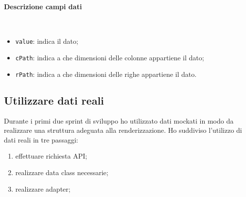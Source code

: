 \paragraph{Descrizione campi dati} \mbox{} \\
\begin{itemize}
	\item \verb|value|: indica il dato;
	\item \verb|cPath|: indica a che dimensioni delle colonne appartiene il dato;
	\item \verb|rPath|: indica a che dimensioni delle righe appartiene il dato.
\end{itemize}

\subsection{Utilizzare dati reali}
Durante i primi due sprint di sviluppo ho utilizzato dati mockati in modo da realizzare una struttura adeguata alla renderizzazione. Ho suddiviso l'utilizzo di dati reali in tre passaggi:
\begin{enumerate}
	\item effettuare richiesta API;
	\item realizzare data class necessarie;
	\item realizzare adapter;
\end{enumerate}

